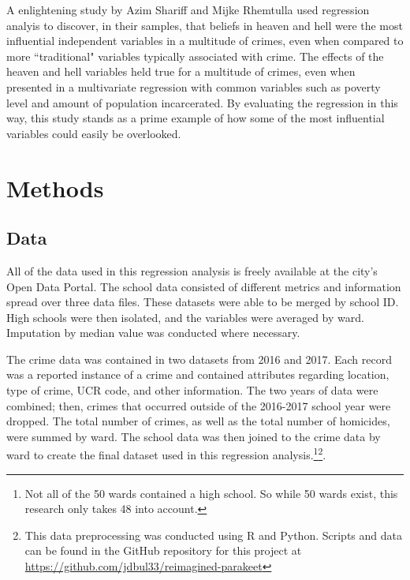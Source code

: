 \documentclass[12pt]{article}
\begin{document}
\par

A enlightening study by Azim Shariff and Mijke Rhemtulla used regression analyis to discover, in their samples, that beliefs in heaven and hell were the most influential independent variables in a multitude of crimes, even when compared to more ``traditional" variables typically associated with crime.\cite{shariff}  The effects of the heaven and hell variables held true for a multitude of crimes, even when presented in a multivariate regression with common variables such as poverty level and amount of population incarcerated.  By evaluating the regression in this way, this study stands as a prime example of how some of the most influential variables could easily be overlooked.


	\section{Methods}


\subsection{Data}

All of the data used in this regression analysis is freely available at the city's Open Data Portal.\cite{c1data}\cite{c2data}\cite{s1data}\cite{s2data}\cite{s3data}  The school data consisted of different metrics and information spread over three data files.  These datasets were able to be merged by school ID.  High schools were then isolated, and the variables were averaged by ward.  Imputation by median value was conducted where necessary.

\par

The crime data was contained in two datasets from 2016 and 2017.  Each record was a reported instance of a crime and contained attributes regarding location, type of crime, UCR code, and other information.  The two years of data were combined; then, crimes that occurred outside of the 2016-2017 school year were dropped.  The total number of crimes, as well as the total number of homicides, were summed by ward.  The school data was then joined to the crime data by ward to create the final dataset used in this regression analysis.\footnote{Not all of the 50 wards contained a high school.  So while 50 wards exist, this research only takes 48 into account.}\footnote{This data preprocessing was conducted using R and Python.  Scripts and data can be found in the GitHub repository for this project at \href{https://github.com/jdbul33/reimagined-parakeet}{https://github.com/jdbul33/reimagined-parakeet}}.
\end{document}
